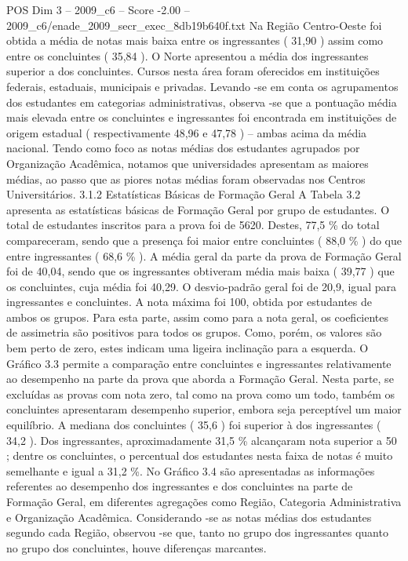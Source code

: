 \begin{textsample}{POS Dim 3 – 2009\_c6 – Score -2.00 – 2009\_c6/enade\_2009\_secr\_exec\_8db19b640f.txt}
Na Região Centro-Oeste foi obtida a média de notas mais baixa entre os ingressantes ( 31,90 ) assim como entre os concluintes ( 35,84 ).
O Norte apresentou a média dos ingressantes superior a dos concluintes.
Cursos nesta área foram oferecidos em instituições federais, estaduais, municipais e privadas.
Levando -se em conta os agrupamentos dos estudantes em categorias administrativas, observa -se que a pontuação média mais elevada entre os concluintes e ingressantes foi encontrada em instituições de origem estadual ( respectivamente 48,96 e 47,78 ) – ambas acima da média nacional.
Tendo como foco as notas médias dos estudantes agrupados por Organização Acadêmica, notamos que universidades apresentam as maiores médias, ao passo que as piores notas médias foram observadas nos Centros Universitários. 3.1.2 Estatísticas Básicas de Formação Geral A Tabela 3.2 apresenta as estatísticas básicas de Formação Geral por grupo de estudantes.
O total de estudantes inscritos para a prova foi de 5620.
Destes, 77,5 \% do total compareceram, sendo que a presença foi maior entre concluintes ( 88,0 \% ) do que entre ingressantes ( 68,6 \% ).
A média geral da parte da prova de Formação Geral foi de 40,04, sendo que os ingressantes obtiveram média mais baixa ( 39,77 ) que os concluintes, cuja média foi 40,29.
O desvio-padrão geral foi de 20,9, igual para ingressantes e concluintes.
A nota máxima foi 100, obtida por estudantes de ambos os grupos.
Para esta parte, assim como para a nota geral, os coeficientes de assimetria são positivos para todos os grupos.
Como, porém, os valores são bem perto de zero, estes indicam uma ligeira inclinação para a esquerda.
O Gráfico 3.3 permite a comparação entre concluintes e ingressantes relativamente ao desempenho na parte da prova que aborda a Formação Geral.
Nesta parte, se excluídas as provas com nota zero, tal como na prova como um todo, também os concluintes apresentaram desempenho superior, embora seja perceptível um maior equilíbrio.
A mediana dos concluintes ( 35,6 ) foi superior à dos ingressantes ( 34,2 ).
Dos ingressantes, aproximadamente 31,5 \% alcançaram nota superior a 50 ; dentre os concluintes, o percentual dos estudantes nesta faixa de notas é muito semelhante e igual a 31,2 \%.
No Gráfico 3.4 são apresentadas as informações referentes ao desempenho dos ingressantes e dos concluintes na parte de Formação Geral, em diferentes agregações como Região, Categoria Administrativa e Organização Acadêmica.
Considerando -se as notas médias dos estudantes segundo cada Região, observou -se que, tanto no grupo dos ingressantes quanto no grupo dos concluintes, houve diferenças marcantes.

\end{textsample}
